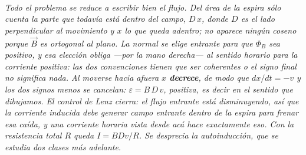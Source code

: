 \begin{center}
\\[0.5em]
{\small\itshape Todo el problema se reduce a escribir bien el flujo. Del área
de la espira sólo cuenta la parte que todavía está dentro del campo, $D\,x$,
donde $D$ es el lado \emph{perpendicular} al movimiento y $x$ lo que queda
adentro; no aparece ningún coseno porque $\vec B$ es ortogonal al plano. La
normal se elige entrante para que $\Phi_B$ sea positivo, y esa elección obliga
---por la mano derecha--- al sentido horario para la corriente positiva: las dos
convenciones tienen que ser coherentes o el signo final no significa nada. Al
moverse hacia afuera $x$ \textbf{decrece}, de modo que $dx/dt = -v$ y los dos
signos menos se cancelan: $\varepsilon = B\,D\,v$, positiva, es decir en el
sentido que dibujamos. El control de Lenz cierra: el flujo entrante está
disminuyendo, así que la corriente inducida debe generar campo entrante dentro
de la espira para frenar esa caída, y una corriente horaria vista desde acá hace
exactamente eso. Con la resistencia total $R$ queda $I = BDv/R$. Se desprecia la
autoinducción, que se estudia dos clases más adelante.}
\end{center}
